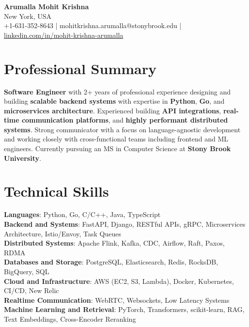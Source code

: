 \documentclass[letterpaper,11pt]{article}
\begin{document}
\begin{center}
  {\Large \textbf{Arumalla Mohit Krishna}} \\
  New York, USA \\
  +1-631-352-8643 \enspace | \enspace mohitkrishna.arumalla@stonybrook.edu \enspace | \enspace \href{https://www.linkedin.com/in/mohit-krishna-arumalla}{linkedin.com/in/mohit-krishna-arumalla}
\end{center}

\section{Professional Summary}
  \begin{itemize}[leftmargin=0.15in, label={}]
    \small{\item{
     \textbf{Software Engineer} with 2+ years of professional experience designing and building \textbf{scalable backend systems} with expertise in \textbf{Python}, \textbf{Go}, and \textbf{microservices architecture}. Experienced building \textbf{API integrations}, \textbf{real-time communication platforms}, and \textbf{highly performant distributed systems}. Strong communicator with a focus on language-agnostic development and working closely with cross-functional teams including frontend and ML engineers. Currently pursuing an MS in Computer Science at \textbf{Stony Brook University}.
    }}
  \end{itemize}
\vspace{-16pt}

\section{Technical Skills}
 \begin{itemize}[leftmargin=0.15in, label={}]
    \small{\item{
     \textbf{Languages}: Python, Go, C/C++, Java, TypeScript \\
     \textbf{Backend and Systems}: FastAPI, Django, RESTful APIs, gRPC, Microservices Architecture, Istio/Envoy, Task Queues \\
     \textbf{Distributed Systems}: Apache Flink, Kafka, CDC, Airflow, Raft, Paxos, RDMA \\
     \textbf{Databases and Storage}: PostgreSQL, Elasticsearch, Redis, RocksDB, BigQuery, SQL \\
     \textbf{Cloud and Infrastructure}: AWS (EC2, S3, Lambda), Docker, Kubernetes, CI/CD, New Relic \\
     \textbf{Realtime Communication}: WebRTC, Websockets, Low Latency Systems \\
     \textbf{Machine Learning and Retrieval}: PyTorch, Transformers, scikit-learn, RAG, Text Embeddings, Cross-Encoder Reranking
    }}
 \end{itemize}
\vspace{-16pt}
\end{document}
